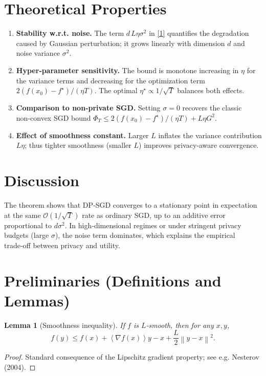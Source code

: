 \documentclass{article}
\newtheorem{lemma}{Lemma}
\newcommand{\norm}[1]{\left\|#1\right\|}
\newcommand{\inner}[1]{\left\langle #1 \right\rangle}
\begin{document}
\section*{Theoretical Properties}
\begin{enumerate}[label=\arabic*)]
\item \textbf{Stability w.r.t. noise.} The term $d\,L\eta\sigma^{2}$ in \eqref{1} quantifies the degradation caused by Gaussian perturbation; it grows linearly with dimension $d$ and noise variance $\sigma^{2}$.
\item \textbf{Hyper‑parameter sensitivity.} The bound is monotone increasing in $\eta$ for the variance terms and decreasing for the optimization term $2(f(x_{0})-f^{\star})/(\eta T)$. The optimal $\eta^{\star}\propto 1/\sqrt{T}$ balances both effects.
\item \textbf{Comparison to non‑private SGD.} Setting $\sigma=0$ recovers the classic non‑convex SGD bound $\Phi_{T}\le 2(f(x_{0})-f^{\star})/(\eta T)+L\eta G^{2}$.
\item \textbf{Effect of smoothness constant.} Larger $L$ inflates the variance contribution $L\eta$; thus tighter smoothness (smaller $L$) improves privacy‑aware convergence.
\end{enumerate}

\section*{Discussion}
The theorem shows that DP‑SGD converges to a stationary point in expectation at the same $\mathcal{O}(1/\sqrt{T})$ rate as ordinary SGD, up to an additive error proportional to $d\sigma^{2}$. In high‑dimensional regimes or under stringent privacy budgets (large $\sigma$), the noise term dominates, which explains the empirical trade‑off between privacy and utility.

\newpage
\section*{Preliminaries (Definitions and Lemmas)}
\begin{lemma}[Smoothness inequality]\label{lem:smooth}
If $f$ is $L$‑smooth, then for any $x,y$,
\[
f(y)\le f(x)+\inner{\nabla f(x)}{y-x}+\frac{L}{2}\norm{y-x}^{2}.
\]
\end{lemma}
\begin{proof}
Standard consequence of the Lipschitz gradient property; see e.g. Nesterov (2004). \qedhere
\end{proof}
\end{document}
